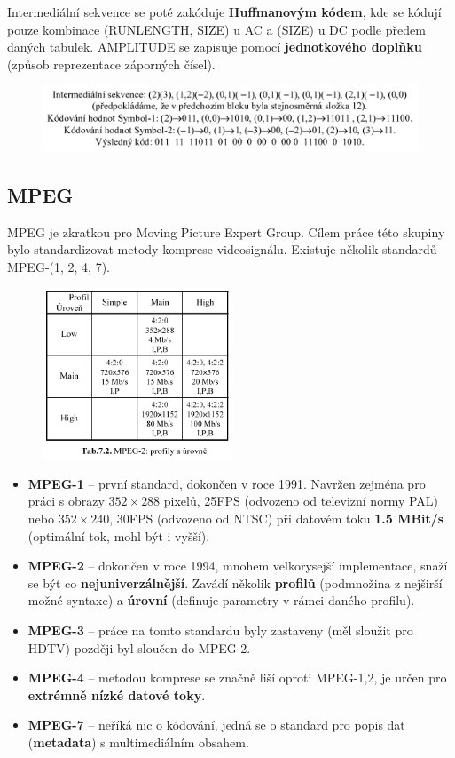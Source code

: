 \begin{enumerate}
\begin{itemize}
	\end{itemize}
	Intermediální sekvence se poté zakóduje \textbf{Huffmanovým kódem}, kde se kódují pouze kombinace (RUNLENGTH, SIZE) u AC a (SIZE) u DC podle předem daných tabulek. AMPLITUDE se zapisuje pomocí \textbf{jednotkového doplňku} (způsob reprezentace záporných čísel).
	\begin{figure}[H]
		\centering
		\includegraphics[width=\textwidth]{assets/7_intermediate}
	\end{figure}
\end{enumerate}

\subsection{MPEG}
MPEG je zkratkou pro Moving Picture Expert Group. Cílem práce této skupiny bylo standardizovat metody komprese videosignálu. Existuje několik standardů MPEG-(1, 2, 4, 7). 

\begin{figure}[H]
	\centering
	\includegraphics[width=0.5\textwidth]{assets/7_mpeg}
\end{figure}

\begin{itemize}
\item \textbf{MPEG-1} -- první standard, dokončen v roce 1991. Navržen zejména pro práci s obrazy $352\times288$ pixelů, 25FPS (odvozeno od televizní normy PAL) nebo $352\times240$, 30FPS (odvozeno od NTSC) při datovém toku \textbf{1.5 MBit/s} (optimální tok, mohl být i vyšší).
\item \textbf{MPEG-2} -- dokončen v roce 1994, mnohem velkorysejší implementace, snaží se být co \textbf{nejuniverzálnější}. Zavádí několik \textbf{profilů} (podmnožina z nejširší možné syntaxe) a \textbf{úrovní} (definuje parametry v rámci daného profilu).
\item \textbf{MPEG-3} -- práce na tomto standardu byly zastaveny (měl sloužit pro HDTV) později byl sloučen do MPEG-2.
\item \textbf{MPEG-4} -- metodou komprese se značně liší oproti MPEG-1,2, je určen pro \textbf{extrémně nízké datové toky}.
\item \textbf{MPEG-7} -- neříká nic o kódování, jedná se o standard pro popis dat (\textbf{metadata}) s multimediálním obsahem.
\end{itemize}

